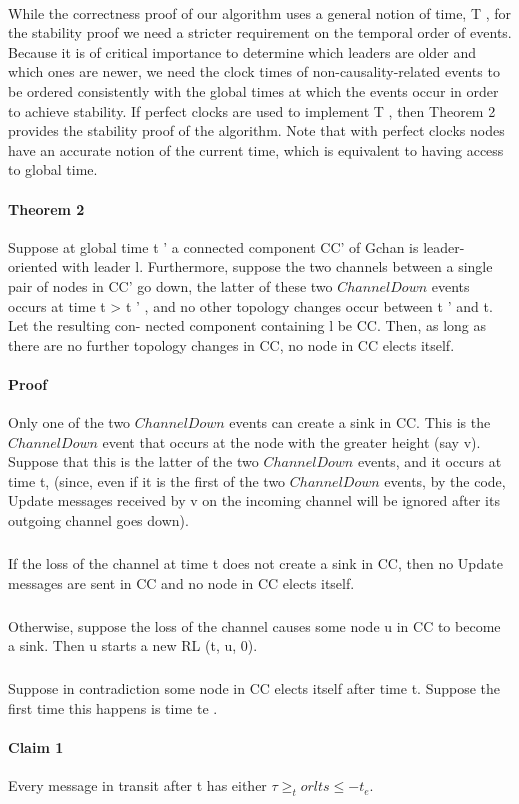 \paragraph{}While the correctness proof of our algorithm uses a general notion of time, T , for the stability proof we need a stricter requirement on the temporal order of events. Because it is of critical importance to determine which leaders are older and which ones are newer, we need the clock times of non-causality-related events to be ordered consistently with the global times at which the events occur in order to achieve stability. If perfect clocks are used to implement T , then Theorem 2 provides the stability proof of the algorithm. Note that with perfect clocks nodes have an accurate notion of the current time, which is equivalent to having access to global time.
\paragraph{Theorem 2}Suppose at global time t ' a connected component CC' of Gchan is leader- oriented with leader l. Furthermore, suppose the two channels between a single pair of nodes in CC' go down, the latter of these two $ChannelDown$ events occurs at time t > t ' , and no other topology changes occur between t ' and t. Let the resulting con- nected component containing l be CC. Then, as long as there are no further topology changes in CC, no node in CC elects itself.
\paragraph{Proof}Only one of the two $ChannelDown$ events can create a sink in CC. This is the $ChannelDown$ event that occurs at the node with the greater height (say v). Suppose that this is the latter of the two $ChannelDown$ events, and it occurs at time t, (since, even if it is the first of the two $ChannelDown$ events, by the code, Update messages received by v on the incoming channel will be ignored after its outgoing channel goes down).
\subparagraph{}If the loss of the channel at time t does not create a sink in CC, then no Update messages are sent in CC and no node in CC elects itself.
\subparagraph{}Otherwise, suppose the loss of the channel causes some node u in CC to become a sink. Then u starts a new RL (t, u, 0).
\subparagraph{}Suppose in contradiction some node in CC elects itself after time t. Suppose the first time this happens is time te .
\paragraph{Claim 1}Every message in transit after t has either $\tau \geq _t or lts \leq -t_e$.
